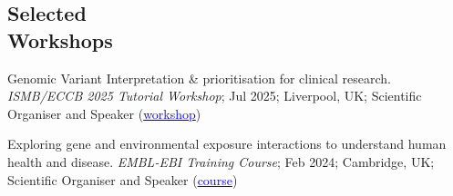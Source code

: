 \documentclass[margin,line]{res}
\begin{document}
\begin{resume}







\section{\sc Selected\\ Workshops}


Genomic Variant Interpretation \& prioritisation for clinical research. {\em ISMB/ECCB 2025 Tutorial Workshop}; Jul 2025; Liverpool, UK; Scientific Organiser and Speaker (\href{https://www.iscb.org/ismbeccb2025/programme-agenda/tutorials#ip3/}{\textcolor{blue}{workshop}})

Exploring gene and environmental exposure interactions to understand human health and disease. {\em EMBL-EBI Training Course}; Feb 2024; Cambridge, UK; Scientific Organiser and Speaker (\href{https://https://www.ebi.ac.uk/training/events/exploring-gene-and-environmental-exposure-interactions-understand-human-health-and-disease/}{\textcolor{blue}{course}})


\end{resume}
\end{document}
